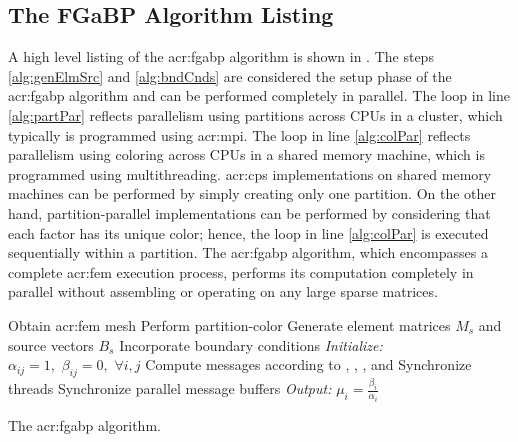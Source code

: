 \subsection{The FGaBP Algorithm Listing}
A high level listing of the \gls{acr:fgabp} algorithm is shown in .
The steps \ref{alg:genElmSrc} and \ref{alg:bndCnds} are considered the setup phase of the \gls{acr:fgabp} algorithm and can be performed completely in parallel.
The loop in line \ref{alg:partPar} reflects parallelism using partitions across CPUs in a cluster, which typically is programmed using \gls{acr:mpi}.
The loop in line \ref{alg:colPar} reflects parallelism using coloring across CPUs in a shared memory machine, which is programmed using multithreading.
\gls{acr:cps} implementations on shared memory machines can be performed by simply creating only one partition.
On the other hand, partition-parallel implementations can be performed by considering that each factor has its unique color; hence, the loop in line \ref{alg:colPar} is executed sequentially within a partition.
The \gls{acr:fgabp} algorithm, which encompasses a complete \gls{acr:fem} execution process, performs its computation completely in parallel without assembling or operating on any large sparse matrices.

\begin{algorithm}[h]
	\begin{algorithmic}[1]
		\STATE Obtain \gls{acr:fem} mesh
		\STATE Perform partition-color
		\STATE Generate element matrices $M_s$ and source vectors $B_s$ \label{alg:genElmSrc}
		\STATE Incorporate boundary conditions \label{alg:bndCnds}
		\STATE \textit{Initialize:} $\alpha_{ij} = 1,\,\, \beta_{ij} = 0,\,\,\forall i,j$
		\REPEAT[\gls{acr:fgabp} iteration: $t=1,2,\cdots$]
		 \label{alg:partPar}
		 \label{alg:colPar}
		\STATE  Compute messages according to , , , and 
	\ENDLOOP
	\STATE Synchronize threads
\ENDLOOP
\STATE Synchronize parallel message buffers
\ENDLOOP
{}
\STATE \textit{Output:} $\mu_i = \frac{\beta_i}{\alpha_i}$
  \end{algorithmic}
  \caption{The \acrshort{acr:fgabp} algorithm.}
  \label{alg:FGaBP}
\end{algorithm}




